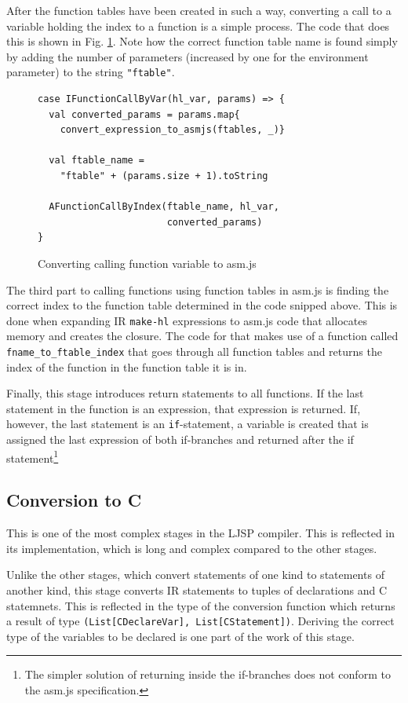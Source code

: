 \documentclass[11pt]{report}
\begin{document}
After the function tables have been created in such a way, converting a call to a variable holding the index to a function is a simple process. The code that does this is shown in Fig. \ref{iconvasmjs2}. Note how the correct function table name is found simply by adding the number of parameters (increased by one for the environment parameter) to the string \texttt{"ftable"}.

\begin{figure}[ht]
\begin{lstlisting}
case IFunctionCallByVar(hl_var, params) => {
  val converted_params = params.map{
    convert_expression_to_asmjs(ftables, _)}
    
  val ftable_name = 
    "ftable" + (params.size + 1).toString
    
  AFunctionCallByIndex(ftable_name, hl_var, 
                       converted_params)
}
\end{lstlisting}
\caption{Converting calling function variable to asm.js}
\label{iconvasmjs2}
\end{figure}

The third part to calling functions using function tables in asm.js is finding the correct index to the function table determined in the code snipped above. This is done when expanding IR \texttt{make-hl} expressions to asm.js code that allocates memory and creates the closure. The code for that makes use of a function called \texttt{fname_to_ftable_index} that goes through all function tables and returns the index of the function in the function table it is in.

Finally, this stage introduces return statements to all functions. If the last statement in the function is an expression, that expression is returned. If, however, the last statement is an \texttt{if}-statement, a variable is created that is assigned the last expression of both if-branches and returned after the if statement\footnote{The simpler solution of returning inside the if-branches does not conform to the asm.js specification.}

\subsection{Conversion to C}
This is one of the most complex stages in the LJSP compiler. This is reflected in its implementation, which is long and complex compared to the other stages.

Unlike the other stages, which convert statements of one kind to statements of another kind, this stage converts IR statements to tuples of declarations and C statemnets. This is reflected in the type of the conversion function which returns a result of type \texttt{(List[CDeclareVar], List[CStatement])}. Deriving the correct type of the variables to be declared is one part of the work of this stage.
\end{document}
